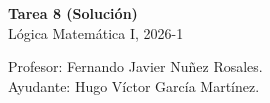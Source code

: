 \documentclass[letterpaper,DIV=15,headsepline,12pt]{scrartcl}
\begin{document}
    \thispagestyle{beginstyle}
    \begin{center}
        {\fontsize{30}{60}\rmfamily \textbf{Tarea 8 (Solución)}} \\ \vspace{.2cm}
        Lógica Matemática I, 2026-1
    \end{center}
    \begin{flushright}
        \footnotesize \hfill Profesor: Fernando Javier Nuñez Rosales.\\
        \hfill Ayudante: Hugo Víctor García Martínez.
    \end{flushright}
\end{document}
